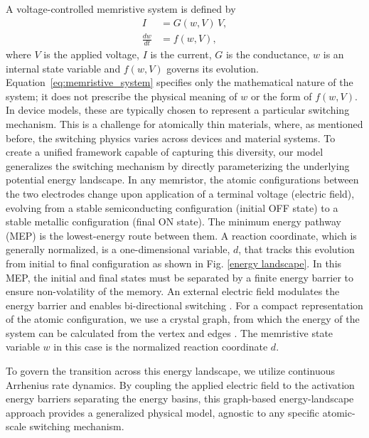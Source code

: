 \documentclass[aip,apl,reprint,floatfix]{revtex4-2}
\begin{document}

A voltage-controlled memristive system \cite{Chua1976} is defined by
\begin{equation}
\begin{aligned}
    I &= G(w,V)\,V, \\
    \frac{dw}{dt} &= f(w,V),
\end{aligned}
\label{eq:memristive_system}
\end{equation}
where $V$ is the applied voltage, $I$ is the current, $G$ is the conductance, $w$ is an internal state variable and $f(w,V)$ governs its evolution. Equation~\eqref{eq:memristive_system} specifies only the mathematical nature of the system; it does not prescribe the physical meaning of $w$ or the form of $f(w,V)$. In device models, these are typically chosen to represent a particular switching mechanism. This is a challenge for atomically thin materials, where, as mentioned before, the switching physics varies across devices and material systems. To create a unified framework capable of capturing this diversity, our model generalizes the switching mechanism by directly parameterizing the underlying potential energy landscape. In any memristor, the atomic configurations between the two electrodes change upon application of a terminal voltage (electric field), evolving from a stable semiconducting configuration (initial OFF state) to a stable metallic configuration (final ON state). The minimum energy pathway (MEP) is the lowest-energy route between them. A reaction coordinate, which is generally normalized, is a one-dimensional variable, $d$, that tracks this evolution from initial to final configuration as shown in Fig. \ref{energy landscape}. In this MEP, the initial and final states must be separated by a finite energy barrier to ensure non-volatility of the memory. An external electric field modulates the energy barrier and enables bi-directional switching \cite{Ducry2022,Mitra2021,Guha}. For a compact representation of the atomic configuration, we use a crystal graph, from which the energy of the system can be calculated from the vertex and edges \cite{Zhao}. The memristive state variable $w$ in this case is the normalized reaction coordinate $d$.

To govern the transition across this energy landscape, we utilize continuous Arrhenius rate dynamics. By coupling the applied electric field to the activation energy barriers separating the energy basins, this graph-based energy-landscape approach provides a generalized physical model, agnostic to any specific atomic-scale switching mechanism.
\end{document}

